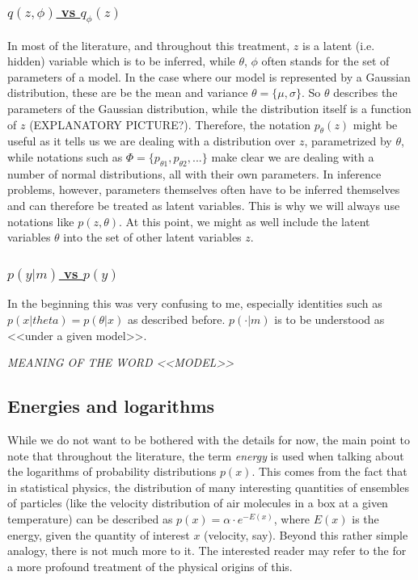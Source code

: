 \subsubsection{\underline{$q(z,\phi)$ vs $q_{\phi}(z)$}}
In most of the literature, and throughout this treatment, $z$ is a latent (i.e. hidden) variable which is to be inferred, while $\theta$, $\phi$ often stands for the set of parameters of a model. In the case where our model is represented by a Gaussian distribution, these are be the mean and variance $\theta=\{\mu,\sigma\}$. So $\theta$ describes the parameters of the Gaussian distribution, while the distribution itself is a function of $z$ (EXPLANATORY PICTURE?). Therefore, the notation $p_\theta(z)$ might be useful as it tells us we are dealing with a distribution over $z$, parametrized by $\theta$, while notations such as $\Phi = \{ p_{\theta 1}, p_{\theta 2}, ... \}$ make clear we are dealing with a number of normal distributions, all with their own parameters. In inference problems, however, parameters themselves often have to be inferred themselves and can therefore be treated as latent variables. This is why we will always use notations like $p(z,\theta)$. At this point, we might as well include the latent variables $\theta$ into the set of other latent variables $z$.

\subsubsection{\underline{$p(y|m)$ vs $p(y)$}}

In the beginning this was very confusing to me, especially identities such as $p(x|theta) = p(\theta|x)$ as described before.  $p(\cdot |m)$ is to be understood as <<under a given model>>.


\emph{MEANING OF THE WORD <<MODEL>>}

\subsection{Energies and logarithms}

\noindent While we do not want to be bothered with the details for now, the main point to note that throughout the literature, the term \textit{energy} is used when talking about the logarithms of probability distributions $p(x)$. This comes from the fact that in statistical physics, the distribution of many interesting quantities of ensembles of particles (like the velocity distribution of air molecules in a box at a given temperature) can be described as $p(x) = \alpha \cdot e^{-E(x)}$, where $E(x)$ is the energy, given the quantity of interest $x$ (velocity, say). Beyond this rather simple analogy, there is not much more to it. The interested reader may refer to the  for a more profound treatment of the physical origins of this.


